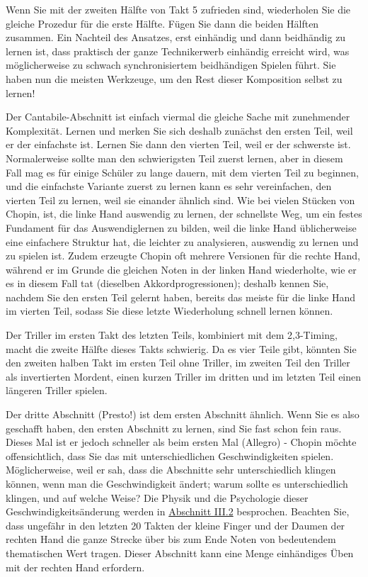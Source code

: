 Wenn Sie mit der zweiten Hälfte von Takt 5 zufrieden sind, wiederholen Sie die gleiche Prozedur für die erste Hälfte.
Fügen Sie dann die beiden Hälften zusammen.
Ein Nachteil des Ansatzes, erst einhändig und dann beidhändig zu lernen ist, dass praktisch der ganze Technikerwerb einhändig erreicht wird, was möglicherweise zu schwach synchronisiertem beidhändigen Spielen führt.
Sie haben nun die meisten Werkzeuge, um den Rest dieser Komposition selbst zu lernen!

Der Cantabile-Abschnitt ist einfach viermal die gleiche Sache mit zunehmender Komplexität.
Lernen und merken Sie sich deshalb zunächst den ersten Teil, weil er der einfachste ist.
Lernen Sie dann den vierten Teil, weil er der schwerste ist.
Normalerweise sollte man den schwierigsten Teil zuerst lernen, aber in diesem Fall mag es für einige Schüler zu lange dauern, mit dem vierten Teil zu beginnen, und die einfachste Variante zuerst zu lernen kann es sehr vereinfachen, den vierten Teil zu lernen, weil sie einander ähnlich sind.
Wie  bei vielen Stücken von Chopin, ist, die linke Hand auswendig zu lernen, der schnellste Weg, um ein festes Fundament für das Auswendiglernen zu bilden, weil die linke Hand üblicherweise eine einfachere Struktur hat, die leichter zu analysieren, auswendig zu lernen und zu spielen ist.
Zudem erzeugte Chopin oft mehrere Versionen für die rechte Hand, während er im Grunde die gleichen Noten in der linken Hand wiederholte, wie er es in diesem Fall tat (dieselben Akkordprogressionen);
deshalb kennen Sie, nachdem Sie den ersten Teil gelernt haben, bereits das meiste für die linke Hand im vierten Teil, sodass Sie diese letzte Wiederholung schnell lernen können.

Der Triller im ersten Takt des letzten Teils, kombiniert mit dem 2,3-Timing, macht die zweite Hälfte dieses Takts schwierig.
Da es vier Teile gibt, könnten Sie den zweiten halben Takt im ersten Teil ohne Triller, im zweiten Teil den Triller als invertierten Mordent, einen kurzen Triller im dritten und im letzten Teil einen längeren Triller spielen.

Der dritte Abschnitt (Presto!) ist dem ersten Abschnitt ähnlich.
Wenn Sie es also geschafft haben, den ersten Abschnitt zu lernen, sind Sie fast schon fein raus.
Dieses Mal ist er jedoch schneller als beim ersten Mal (Allegro) - 
Chopin möchte offensichtlich, dass Sie das mit unterschiedlichen Geschwindigkeiten spielen.
Möglicherweise, weil er sah, dass die Abschnitte sehr unterschiedlich klingen können, wenn man die Geschwindigkeit ändert;
warum sollte es unterschiedlich klingen, und auf welche Weise?
Die Physik und die Psychologie dieser Geschwindigkeitsänderung werden in \hyperlink{c1iii2}{Abschnitt III.2} besprochen.
Beachten Sie, dass ungefähr in den letzten 20 Takten der kleine Finger und der Daumen der rechten Hand die ganze Strecke über bis zum Ende Noten von bedeutendem thematischen Wert tragen.
Dieser Abschnitt kann eine Menge einhändiges Üben mit der rechten Hand erfordern.


